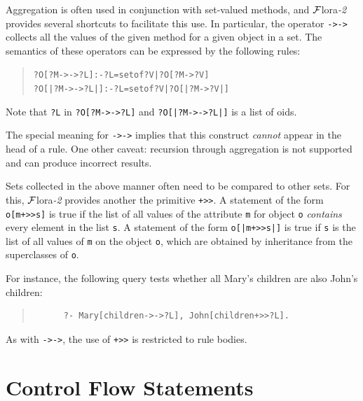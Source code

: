 \documentclass[11pt]{article}
\newcommand{\FLORA}{{\mbox{\sc ${\cal F}${lora}\rm\emph{-2}}}\xspace}
\newcommand{\FLSYSTEM}{\FLORA}
\begin{document}
\index{{\tt ->->}}
Aggregation is often used in conjunction with set-valued methods, and
\FLSYSTEM provides several shortcuts to facilitate this use.
In particular, the operator {\tt ->->} 
collects all the values of the given
method for a given object in a set. The semantics of these operators can be
expressed by the following rules:

\begin{quote}
\begin{alltt}
?O[?M->->?L] :- ?L=setof{?V|?O[?M->?V]} \vspace{2mm}
?O[|?M->->?L|] :- ?L=setof{?V|?O[|?M->?V|]}
\end{alltt}
\end{quote}

\noindent
Note that \texttt{?L}  in {\tt ?O[?M->->?L]}  and {\tt ?O[|?M->->?L|]} is a list of oids.

The special meaning for {\tt ->->} implies that this
construct \emph{cannot} appear in the head of a rule.
One other caveat: recursion through aggregation is not supported and can
produce incorrect results.



\index{\tt +>{}>}
Sets collected in the above manner often  need to be compared to other
sets. For this, \FLSYSTEM provides another the primitive {\tt +>{}>}.
A statement of the form {\tt o[m+>{}>s]} is true if the list of all values of the
attribute {\tt m} for object {\tt o} \emph{contains} every
element in the list {\tt s}.  
A statement of the form \texttt{o[|m+>{}>s|]}  is true if \texttt{s} is the
list of all values of \texttt{m} on the object \texttt{o}, which are
obtained by inheritance from the superclasses of \texttt{o}.   

For instance, the following query tests whether all Mary's children are
also John's children:
\begin{quote}
\begin{verbatim}
      ?- Mary[children->->?L], John[children+>>?L].
\end{verbatim}
\end{quote}

As with {\tt ->->}, the use of {\tt +>{}>} is restricted to rule bodies.


\section{Control Flow Statements}\label{sec:control}
\end{document}
